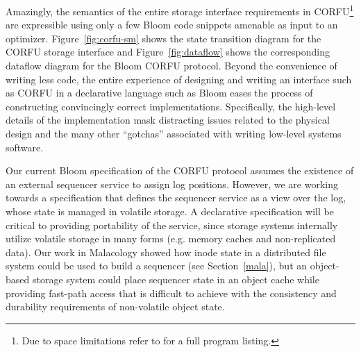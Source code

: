 Amazingly, the semantics of the entire storage interface requirements in
CORFU\footnote{Due to space limitations refer to \cite{watkins:ucsc-soe-16-12}
for a full program listing.} are expressible using only a few Bloom code
snippets amenable as input to an optimizer.  Figure~\ref{fig:corfu-sm}
shows the state transition diagram for the CORFU storage interface and
Figure~\ref{fig:dataflow} shows the corresponding dataflow diagram for the
Bloom CORFU protocol. Beyond the convenience of writing less code, the
entire experience of designing and writing an interface such as CORFU in a
declarative language such as Bloom eases the process of constructing
convincingly correct implementations. Specifically, the high-level details
of the implementation mask distracting issues related to the physical
design and the many other ``gotchas'' associated with writing low-level
systems software.

Our current Bloom specification of the CORFU protocol assumes the existence of
an external sequencer service to assign log positions. However, we are working
towards a specification that defines the sequencer service as a view over the
log, whose state is managed in volatile storage. A declarative specification
will be critical to providing portability of the service, since storage
systems internally utilize volatile storage in many forms (e.g. memory caches
and non-replicated data). Our work in Malacology showed how inode state in a
distributed file system could be used to build a sequencer (see
Section~\ref{mala}), but an object-based storage system could place sequencer
state in an object cache while providing fast-path access that is difficult to
achieve with the consistency and durability requirements of non-volatile
object state.




